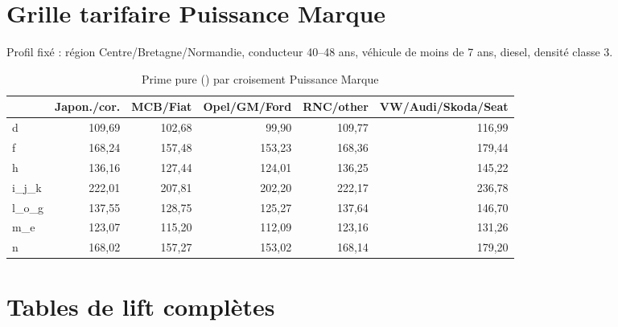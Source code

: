 \documentclass[11pt,a4paper]{article}
\newcommand{\eur}{\texteuro}
\begin{document}
\newpage
\appendix

\section{Grille tarifaire Puissance \texttimes{} Marque}
\label{annexe:grille}

Profil fixé : région Centre/Bretagne/Normandie, conducteur 40--48 ans, véhicule de moins de 7 ans, diesel, densité classe 3.

\begin{table}[H]
\centering
\caption{Prime pure (\eur) par croisement Puissance \texttimes{} Marque}
\small
\begin{tabular}{lrrrrr}
\toprule
 & Japon./cor. & MCB/Fiat & Opel/GM/Ford & RNC/other & VW/Audi/Skoda/Seat \\
\midrule
d & 109{,}69 & 102{,}68 & 99{,}90 & 109{,}77 & 116{,}99 \\
f & 168{,}24 & 157{,}48 & 153{,}23 & 168{,}36 & 179{,}44 \\
h & 136{,}16 & 127{,}44 & 124{,}01 & 136{,}25 & 145{,}22 \\
i\_j\_k & 222{,}01 & 207{,}81 & 202{,}20 & 222{,}17 & 236{,}78 \\
l\_o\_g & 137{,}55 & 128{,}75 & 125{,}27 & 137{,}64 & 146{,}70 \\
m\_e & 123{,}07 & 115{,}20 & 112{,}09 & 123{,}16 & 131{,}26 \\
n & 168{,}02 & 157{,}27 & 153{,}02 & 168{,}14 & 179{,}20 \\
\bottomrule
\end{tabular}
\end{table}

\section{Tables de lift complètes}
\end{document}
